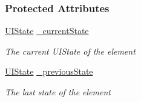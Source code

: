 \subsubsection*{Protected Attributes}
\begin{DoxyCompactItemize}
\item 
\hyperlink{namespace_m_b2_d_1_1_u_i_a3d5fed7e80959a1444165894dfd9e75b}{U\+I\+State} \hyperlink{class_m_b2_d_1_1_u_i_1_1_u_i_control_element_a20ac4c2a32e73de2457240bf42f512fa}{\+\_\+current\+State}
\begin{DoxyCompactList}\small\item\em The current U\+I\+State of the element \end{DoxyCompactList}\item 
\hyperlink{namespace_m_b2_d_1_1_u_i_a3d5fed7e80959a1444165894dfd9e75b}{U\+I\+State} \hyperlink{class_m_b2_d_1_1_u_i_1_1_u_i_control_element_a3a1c1743b02d8d2daa00231d5bb41067}{\+\_\+previous\+State}
\begin{DoxyCompactList}\small\item\em The last state of the element \end{DoxyCompactList}\end{DoxyCompactItemize}
